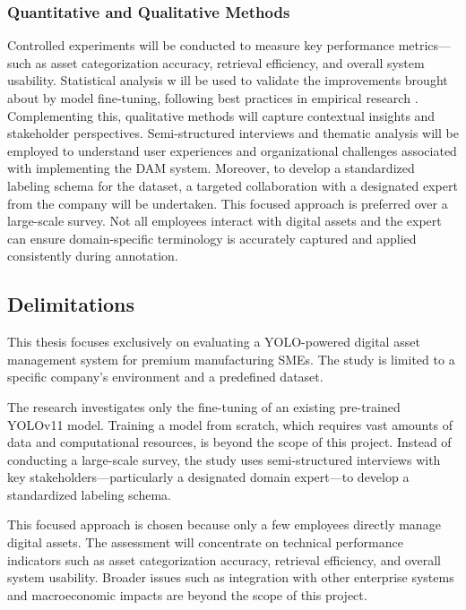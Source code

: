 \documentclass[a4paper,10pt,twocolumn]{article}
\numberwithin{figure}{section}
\numberwithin{table}{section}
\begin{document}
\subsubsection{Quantitative and Qualitative Methods }
\vspace{0.3cm}
Controlled experiments will be conducted to measure key performance 
metrics—such as asset categorization accuracy, retrieval efficiency, 
and overall system usability. Statistical analysis w
ill be used to validate the improvements brought about by model fine-tuning, 
following best practices in empirical research \citep{creswell2014, yin2014case}.
Complementing this, qualitative methods will capture contextual insights and 
stakeholder perspectives. Semi-structured interviews and thematic analysis 
will be employed to understand user experiences and organizational challenges 
associated with implementing the DAM system. 
Moreover, to develop a standardized 
labeling schema for the dataset, a targeted collaboration with a designated 
expert from the company will be undertaken. This focused approach is 
preferred over a large-scale survey. Not all employees interact 
with digital assets and the expert can ensure domain-specific 
terminology is accurately captured and applied consistently during annotation.

\subsection{Delimitations}
This thesis focuses exclusively on evaluating a YOLO-powered digital asset management 
system for premium manufacturing SMEs. The study is limited to a specific company’s 
environment and a predefined dataset.

The research investigates only the fine-tuning of an existing pre-trained YOLOv11 model. 
Training a model from scratch, which requires vast amounts of data and computational resources, 
is beyond the scope of this project.
Instead of conducting a large-scale survey, the study uses semi-structured interviews with key 
stakeholders—particularly a designated domain expert—to develop a standardized labeling schema. 

This focused approach is chosen because only a few employees directly manage digital assets.
The assessment will concentrate on technical performance indicators such as asset categorization accuracy, 
retrieval efficiency, and overall system usability. Broader issues such as integration with other enterprise systems 
and macroeconomic impacts are beyond the scope of this project.
\end{document}

